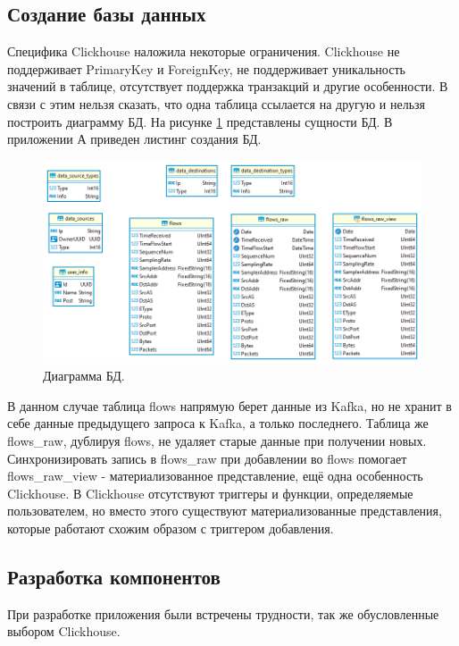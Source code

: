 \subsection{Создание базы данных}
Специфика Clickhouse наложила некоторые ограничения. Clickhouse не поддерживает PrimaryKey и ForeignKey, не поддерживает уникальность значений в таблице, отсутствует поддержка транзакций и другие особенности\cite{clickhouse}. В связи с этим нельзя сказать, что одна таблица ссылается на другую и нельзя построить диаграмму БД. На рисунке \ref{img:DB} представлены сущности БД. В приложении А приведен листинг создания БД. \\
\begin{figure}[H]
	\centering
	\includegraphics[scale=0.55]{images/bd.png}
	\caption{Диаграмма БД.}
	\label{img:DB}
\end{figure}
В данном случае таблица flows напрямую берет данные из Kafka, но не хранит в себе данные предыдущего запроса к Kafka, а только последнего. Таблица же flows\_raw, дублируя flows, не удаляет старые данные при получении новых. Синхронизировать запись в flows\_raw при добавлении во flows помогает flows\_raw\_view - материализованное представление, ещё одна особенность Clickhouse. В Clickhouse отсутствуют триггеры и функции, определяемые пользователем, но вместо этого существуют материализованные представления, которые работают схожим образом с триггером добавления.
\subsection{Разработка компонентов}
При разработке приложения были встречены трудности, так же обусловленные выбором Clickhouse.
